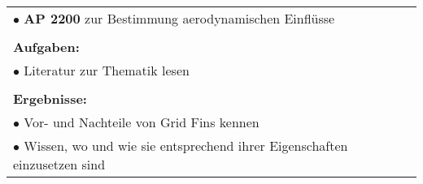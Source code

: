 \begin{table}[!h]
\begin{center}
\begin{tabular}{|p{35mm}||p{55mm}|p{50mm}||p{40mm}|}
			\multicolumn{4}{|p{150mm}|}{$\bullet$ \textbf{AP 2200} zur Bestimmung aerodynamischen Einflüsse}\\
			\multicolumn{4}{|p{150mm}|}{}\\
			\multicolumn{4}{|p{150mm}|}{\textbf{Aufgaben:}}\\
			\multicolumn{4}{|p{150mm}|}{$\bullet$ Literatur zur Thematik lesen}\\
			\multicolumn{4}{|p{150mm}|}{}\\
			\multicolumn{4}{|p{150mm}|}{\textbf{Ergebnisse:}}\\
			\multicolumn{4}{|p{150mm}|}{$\bullet$ Vor- und Nachteile von Grid Fins kennen}\\
			\multicolumn{4}{|p{150mm}|}{$\bullet$ Wissen, wo und wie sie entsprechend ihrer Eigenschaften einzusetzen sind}\\
			\hline
		\end{tabular}
	\end{center}
\end{table}
	
